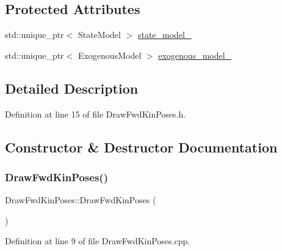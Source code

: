 \subsection*{Protected Attributes}
\begin{DoxyCompactItemize}
\item 
std\+::unique\+\_\+ptr$<$ State\+Model $>$ \hyperlink{classbfl_1_1DrawFwdKinPoses_afcd1bf7246acdc971075b8ba63f8986a}{state\+\_\+model\+\_\+}
\item 
std\+::unique\+\_\+ptr$<$ Exogenous\+Model $>$ \hyperlink{classbfl_1_1DrawFwdKinPoses_af5fcf31aeb103a36830fc8363039540b}{exogenous\+\_\+model\+\_\+}
\end{DoxyCompactItemize}


\subsection{Detailed Description}


Definition at line 15 of file Draw\+Fwd\+Kin\+Poses.\+h.



\subsection{Constructor \& Destructor Documentation}
\mbox{\label{classbfl_1_1DrawFwdKinPoses_a76ac04c55f02309c5724c22694a591c9}} 
\subsubsection{\texorpdfstring{Draw\+Fwd\+Kin\+Poses()}{DrawFwdKinPoses()}\hspace{0.1cm}{\footnotesize\ttfamily [1/2]}}
{\footnotesize\ttfamily Draw\+Fwd\+Kin\+Poses\+::\+Draw\+Fwd\+Kin\+Poses (\begin{DoxyParamCaption}{ }\end{DoxyParamCaption})\hspace{0.3cm}{\ttfamily [noexcept]}}



Definition at line 9 of file Draw\+Fwd\+Kin\+Poses.\+cpp.

\mbox{\label{classbfl_1_1DrawFwdKinPoses_a558686870e99ef9941d9e709a80ecfcc}} 
